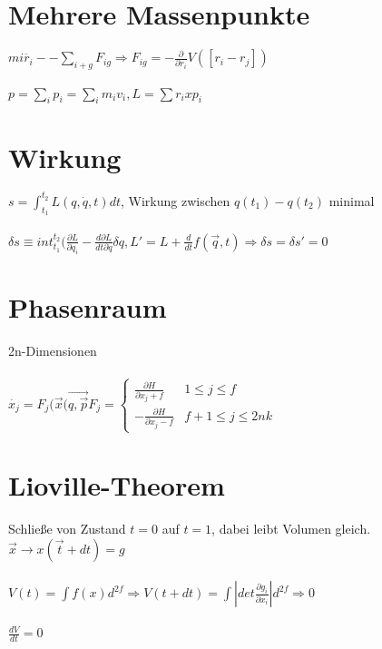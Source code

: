 \documentclass[10pt,a4paper]{article}
\begin{document}
\section{Mehrere Massenpunkte}
$mi \ddot{r_i} -- \sum_{i+g} F_{ig} \Rightarrow F_{ig} = - \frac{\partial}{\partial r_i} V([r_i-r_j])$\\
%
\\
$p=\sum_i p_i = \sum_i m_i v_i, L = \sum r_i x p_i$\\
%
\section{Wirkung}
$s = \int_{t_1}^{t_2}L(q,\dot{q},t)dt$, Wirkung zwischen $q(t_1)-q(t_2)$ minimal\\
%
\\
$\delta s \equiv int_{t_1}^{t_2} (\frac{\partial L}{\partial q_i}-\frac{d \partial L}{dt\partial \dot{q}}\delta q, L'=L+\frac{d}{dt}f(\vec{q},t)\Rightarrow \delta s = \delta s'=0$\\
%
\section{Phasenraum}
2n-Dimensionen\\
%
\\
$\dot{x_j}=F_j(\vec{x}(\vec{q,\vec{p}} F_j= \begin{cases}\frac{\partial H}{\partial x_j+f}& 1 \leq j \leq f \\ -\frac{\partial H}{\partial x_j-f} &f+1\leq j \leq 2nk \end{cases}$
% 
\section{Lioville-Theorem}
Schließe von Zustand $t= 0$ auf $t=1$, dabei leibt Volumen gleich. $\vec{x}\rightarrow x(\vec{t}+dt)=g$\\
%
\\
$V(t) = \int f(x)d^{2f} \Rightarrow V(t+dt)=\int |det\frac{\partial g_i}{\partial x_i}|d^{2f} \Rightarrow 0$\\
%
\\ 
$\frac{dV}{dt}=0$\\
%
\end{document}

